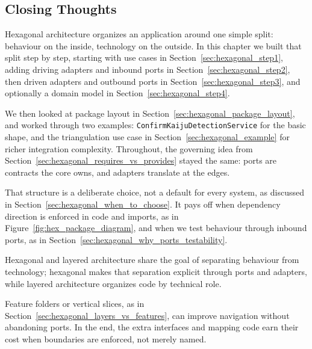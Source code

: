 \subsection{Closing Thoughts}
\label{sec:hexagonal_closing}

Hexagonal architecture organizes an application around one simple split: behaviour on the inside, technology on the outside. In this chapter we built that split step by step, starting with use cases in Section~\ref{sec:hexagonal_step1}, adding driving adapters and inbound ports in Section~\ref{sec:hexagonal_step2}, then driven adapters and outbound ports in Section~\ref{sec:hexagonal_step3}, and optionally a domain model in Section~\ref{sec:hexagonal_step4}. 

We then looked at package layout in Section~\ref{sec:hexagonal_package_layout}, and worked through two examples: \texttt{ConfirmKaijuDetectionService} for the basic shape, and the triangulation use case in Section~\ref{sec:hexagonal_example} for richer integration complexity. Throughout, the governing idea from Section~\ref{sec:hexagonal_requires_vs_provides} stayed the same: ports are contracts the core owns, and adapters translate at the edges.

That structure is a deliberate choice, not a default for every system, as discussed in Section~\ref{sec:hexagonal_when_to_choose}. It pays off when dependency direction is enforced in code and imports, as in Figure~\ref{fig:hex_package_diagram}, and when we test behaviour through inbound ports, as in Section~\ref{sec:hexagonal_why_ports_testability}. 

Hexagonal and layered architecture share the goal of separating behaviour from technology; hexagonal makes that separation explicit through ports and adapters, while layered architecture organizes code by technical role. 

Feature folders or vertical slices, as in Section~\ref{sec:hexagonal_layers_vs_features}, can improve navigation without abandoning ports. In the end, the extra interfaces and mapping code earn their cost when boundaries are enforced, not merely named.
